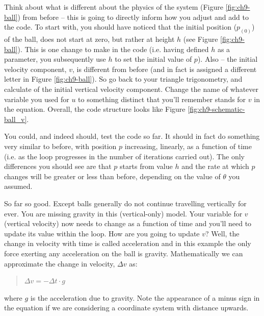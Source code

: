 \documentclass{tufte-book} %
\newenvironment{docspec}{\begin{quotation}\ttfamily\parskip0pt\parindent0pt\ignorespaces}{\end{quotation}}
\begin{document}
Think about what is different about the physics of the system (Figure \ref{fig:ch9-ball}) from before -- this is going to directly inform how you adjust and add to the code. To start with, you should have noticed that the initial position (\(p_{(0)}\)) of the ball, does not start at zero, but rather at height \(h\) (see Figure \ref{fig:ch9-ball}). This is one change to make in the code (i.e. having defined \(h\) as a parameter, you subsequently use \(h\) to set the initial value of \(p\)). Also -- the initial velocity component, \(v\), is different from before (and in fact is assigned a different letter in Figure \ref{fig:ch9-ball}). So go back to your triangle trigonometry,  and calculate of the initial vertical velocity component. Change the name of whatever variable you used for \(u\) to something distinct that you'll remember stands for \(v\) in the equation. Overall, the code structure looks like Figure \ref{fig:ch9-schematic-ball_v}.

You could, and indeed should, test the code so far. It should in fact do something very similar to before, with position \(p\) increasing, linearly, as a function of time (i.e. as the loop progresses in the number of iterations carried out). The only differences you should see are that \(p\) starts from value \(h\) and the rate at which \(p\) changes will be greater or less than before, depending on the value of \(\theta\) you assumed.

So far so good. Except balls generally do not continue travelling vertically for ever. You are missing gravity in this (vertical-only) model. Your variable for \(v\) (vertical velocity) now needs to change as a function of time and you'll need to update its value within the loop. How are you going to update \(v\)? Well, the change in velocity with time is called acceleration and in this example the only force exerting any acceleration on the ball is gravity. Mathematically we can approximate the change in velocity, \(\Delta v\) as:
\begin{docspec}
\(\Delta v=-\Delta t\cdot g\)
\end{docspec}
where \(g\) is the acceleration due to gravity. Note the appearance of a minus sign in the equation if we are considering a coordinate system with distance upwards.
\end{document}
